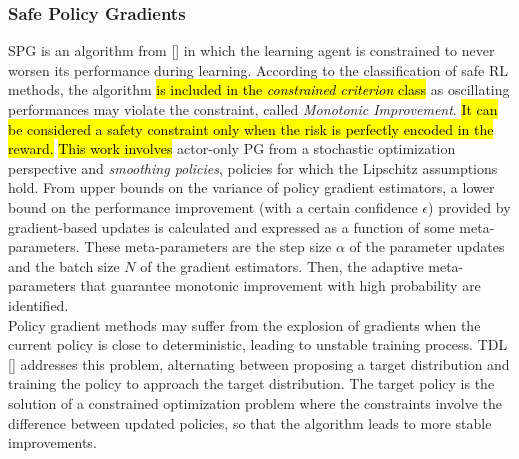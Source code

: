 \subsubsection{Safe Policy Gradients} \label{subsec:safepg}
\acf{SPG} is an algorithm from [\cite{papini2019}] in which the learning agent is constrained to never worsen its performance during learning. According to the classification of safe \ac{RL} methods, the algorithm \hl{is included in the \emph{constrained criterion} class} as oscillating performances may violate the constraint, called \emph{Monotonic Improvement}. \hl{It can be considered a safety constraint only when the risk is perfectly encoded in the reward.} \hl{This work involves} actor-only \ac{PG} from a stochastic optimization perspective and \emph{smoothing policies}, \ie policies for which the Lipschitz assumptions hold. From upper bounds on the variance of policy gradient estimators, a lower bound on the performance improvement (with a certain confidence $\epsilon$) provided by gradient-based updates is calculated and expressed as a function of some meta-parameters. These meta-parameters are the step size $\alpha$ of the parameter updates and the batch size $N$ of the gradient estimators. Then, the adaptive meta-parameters that guarantee monotonic improvement with high probability are identified.\\
\newline 
Policy gradient methods may suffer from the explosion of gradients when the current policy is close to deterministic, leading to unstable training process. \acf{TDL} [\cite{DBLP:journals/corr/abs-1905-11041}] addresses this problem, alternating between proposing a target distribution and training the policy to approach the target distribution. The target policy is the solution of a constrained optimization problem where the constraints involve the difference between updated policies, so that the algorithm leads to more stable improvements.
